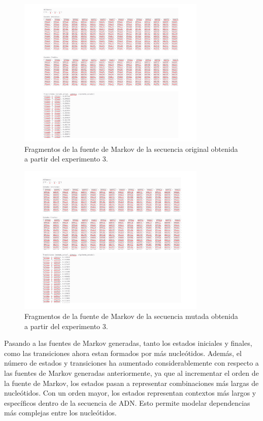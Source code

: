 \documentclass[11pt,spanish,listoffigures,listoftables]{tfgetsinf}
\begin{document}
\begin{figure}[H]
      \centering
      \includegraphics[width=0.8\textwidth]{aut1_exp4.png}
      \caption{Fragmentos de la fuente de Markov de la secuencia original obtenida a partir del experimento 3.}
      \label{fig:etiqueta_opcional43}
\end{figure}

\begin{figure}[H]
      \centering
      \includegraphics[width=0.8\textwidth]{aut2_exp4.png}
      \caption{Fragmentos de la fuente de Markov de la secuencia mutada obtenida a partir del experimento 3.}
      \label{fig:etiqueta_opcional44}
\end{figure}

Pasando a las fuentes de Markov generadas, tanto los estados iniciales y finales, como las transiciones ahora estan formados por más nucleótidos. Además, el número de estados y transiciones ha aumentado considerablemente con respecto a las fuentes de Markov generadas anteriormente, ya que al incrementar el orden de la fuente de Markov, los estados pasan a representar combinaciones más largas de nucleótidos. Con un orden mayor, los estados representan contextos más largos y específicos dentro de la secuencia de \acs{ADN}. Esto permite modelar dependencias más complejas entre los nucleótidos.
\end{document}
